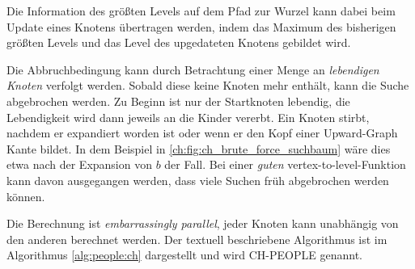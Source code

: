 Die Information des größten Levels auf dem Pfad zur Wurzel kann dabei beim Update eines Knotens übertragen werden, indem das Maximum des bisherigen größten Levels und das Level des upgedateten Knotens gebildet wird.


Die Abbruchbedingung kann durch Betrachtung einer Menge an \emph{lebendigen Knoten} verfolgt werden.
Sobald diese keine Knoten mehr enthält, kann die Suche abgebrochen werden.
Zu Beginn ist nur der Startknoten lebendig, die Lebendigkeit wird dann jeweils an die Kinder vererbt.
Ein Knoten stirbt, nachdem er expandiert worden ist oder wenn er den Kopf einer Upward-Graph Kante bildet.
In dem Beispiel in \autoref{ch:fig:ch_brute_force_suchbaum} wäre dies etwa nach der Expansion von $b$ der Fall.
Bei einer \emph{guten} vertex-to-level-Funktion kann davon ausgegangen werden, dass viele Suchen früh abgebrochen werden können.

Die Berechnung ist \emph{embarrassingly parallel}, jeder Knoten kann unabhängig von den anderen berechnet werden.
Der textuell beschriebene Algorithmus ist im Algorithmus \ref{alg:people:ch} dargestellt und wird CH-PEOPLE genannt.

